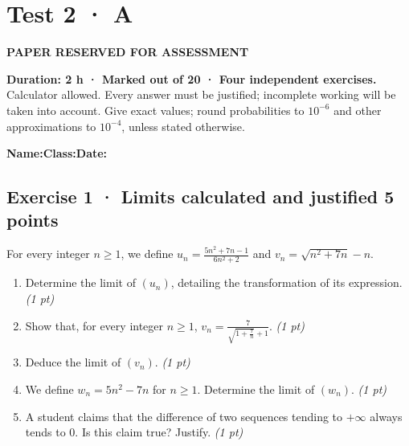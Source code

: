 \fi

\ifprof

\clearpage{}\label{sujet:2-3}

\section*{Test 2 · A}

{\sffamily\bfseries\color{amber}PAPER RESERVED FOR ASSESSMENT\par}

\textbf{Duration: 2 h · Marked out of 20 · Four independent exercises.}\\Calculator allowed. Every answer must be justified; incomplete working will be taken into account. Give exact values; round probabilities to $10^{-6}$ and other approximations to $10^{-4}$, unless stated otherwise.

\smallskip\textbf{Name:}\enspace\dotfill\quad\textbf{Class:}\enspace\dotfill\quad\textbf{Date:}\enspace\dotfill

\subsection*{Exercise 1 · Limits calculated and justified \hfill 5 points}For every integer $n\ge1$, we define $u_n=\frac{5n^2+7n-1}{6n^2+2}$ and $v_n=\sqrt{n^2+7n}-n$.

\begin{enumerate}

\item Determine the limit of $(u_n)$, detailing the transformation of its expression. \hfill\textit{(1 pt)}

\item Show that, for every integer $n\ge1$, $v_n=\frac{7}{\sqrt{1+\frac{7}n}+1}$. \hfill\textit{(1 pt)}

\item Deduce the limit of $(v_n)$. \hfill\textit{(1 pt)}

\item We define $w_n=5n^2-7n$ for $n\ge1$. Determine the limit of $(w_n)$. \hfill\textit{(1 pt)}

\item A student claims that the difference of two sequences tending to $+\infty$ always tends to $0$. Is this claim true? Justify. \hfill\textit{(1 pt)}

\end{enumerate}

